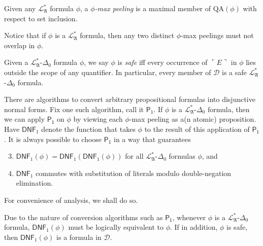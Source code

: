 \documentclass[12pt]{article}
\numberwithin{equation}{section}
\begin{document}
\begin{defi}
Given any $\mathcal{L}^{*}_{\mathfrak{A}}$ formula $\phi$, a $\phi$\emph{-max peeling} is a maximal member of $\mathrm{QA}(\phi)$ with respect to set inclusion.
\end{defi}

\begin{rem}\label{rem320}
Notice that if $\phi$ is a $\mathcal{L}^{*}_{\mathfrak{A}}$ formula, then any two distinct $\phi$-max peelings must not overlap in $\phi$.
\end{rem} 

\begin{defi}
Given a $\mathcal{L}^{*}_{\mathfrak{A}}$-$\Delta_0$ formula $\phi$, we say $\phi$ is \emph{safe} iff every occurrence of $\ulcorner E \urcorner$ in $\phi$ lies outside the scope of any quantifier. In particular, every member of $\mathcal{D}$ is a safe $\mathcal{L}^{*}_{\mathfrak{A}}$-$\Delta_0$ formula.
\end{defi}

There are algorithms to convert arbitrary propositional formulas into disjunctive normal forms. Fix one such algorithm, call it $\mathsf{P_1}$. If $\phi$ is a $\mathcal{L}^{*}_{\mathfrak{A}}$-$\Delta_0$ formula, then we can apply $\mathsf{P_1}$ on $\phi$ by viewing each $\phi$-max peeling as a(n atomic) proposition. Have $\mathsf{DNF}_1$ denote the function that takes $\phi$ to the result of this application of $\mathsf{P_1}$. It is always possible to choose $\mathsf{P_1}$ in a way that guarantees
\begin{enumerate}[label=(\Roman*)]
    \setcounter{enumi}{2}
    \item\label{s323} $\mathsf{DNF}_1(\phi) = \mathsf{DNF}_1(\mathsf{DNF}_1(\phi))$ for all $\mathcal{L}^{*}_{\mathfrak{A}}$-$\Delta_0$ formulas $\phi$, and
    \item\label{s324} $\mathsf{DNF}_1$ commutes with substitution of literals modulo double-negation elimination.
\end{enumerate}
For convenience of analysis, we shall do so.

\begin{rem}\label{rem322}
Due to the nature of conversion algorithms such as $\mathsf{P_1}$, whenever $\phi$ is a $\mathcal{L}^{*}_{\mathfrak{A}}$-$\Delta_0$ formula, $\mathsf{DNF}_1(\phi)$ must be logically equivalent to $\phi$. If in addition, $\phi$ is safe, then $\mathsf{DNF}_1(\phi)$ is a formula in $\mathcal{D}$.
\end{rem}
\end{document}

